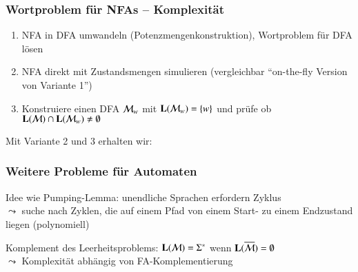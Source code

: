 \documentclass[onlymath]{beamer}
\begin{document}
\begin{frame}[t]\frametitle{Wortproblem für NFAs -- Komplexität}

\begin{enumerate}[{Variante} 1:]
\item \alert{NFA in DFA umwandeln (Potenzmengenkonstruktion), Wortproblem für DFA lösen}
\item \alert{NFA direkt mit Zustandsmengen simulieren (vergleichbar "`on-the-fly Version von Variante 1"')}
\item \alert{Konstruiere einen DFA $\mathcal{M}_w$ mit $\textbf{\textcolor{black}{L}}(\mathcal{M}_w)=\{w\}$ und prüfe ob
$\textbf{\textcolor{black}{L}}(\mathcal{M})\cap \textbf{\textcolor{black}{L}}(\mathcal{M}_w) \neq\emptyset$}
\end{enumerate}

Mit Variante 2 und 3 erhalten wir:\medskip


\end{frame}

\begin{frame}\frametitle{Weitere Probleme für Automaten}


\pause

Idee wie Pumping-Lemma: unendliche Sprachen erfordern Zyklus\\
$\leadsto$ suche nach Zyklen, die auf einem Pfad von einem Start- zu einem Endzustand liegen (polynomiell)\pause

\pause

Komplement des Leerheitsproblems: $\textbf{\textcolor{black}{L}}(\mathcal{M})=\Sigma^*$ wenn $\textbf{\textcolor{black}{L}}(\overline{\mathcal{M}})=\emptyset$\\
$\leadsto$ Komplexität abhängig von FA-Komplementierung


\end{frame}
\end{document}
